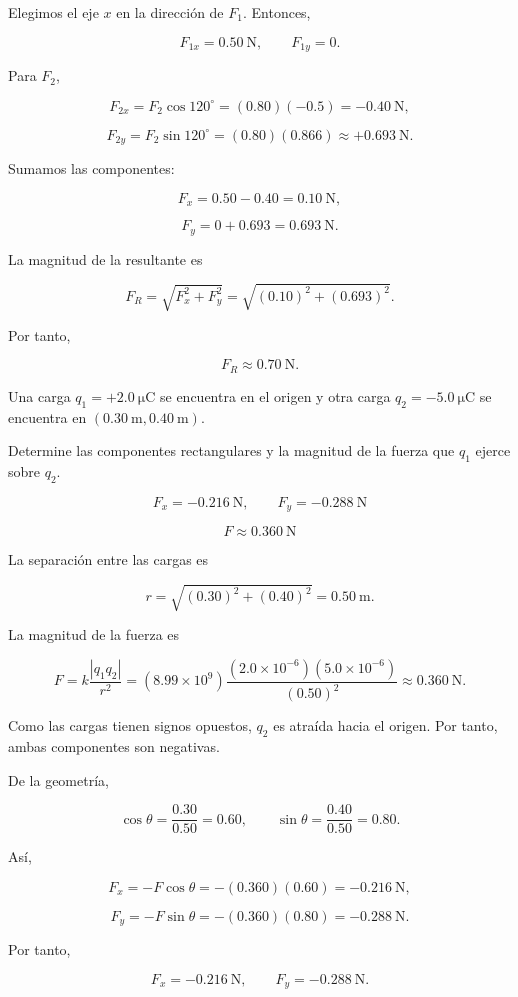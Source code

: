 \begin{explicacion}
Elegimos el eje \(x\) en la dirección de \(F_1\). Entonces,

\[
F_{1x}=\SI{0.50}{\newton}, \qquad F_{1y}=0.
\]

Para \(F_2\),

\[
F_{2x}=F_2\cos120^\circ=(0.80)(-0.5)
=-\SI{0.40}{\newton},
\]

\[
F_{2y}=F_2\sin120^\circ=(0.80)(0.866)
\approx+\SI{0.693}{\newton}.
\]

Sumamos las componentes:

\[
F_x=0.50-0.40=\SI{0.10}{\newton},
\]

\[
F_y=0+0.693=\SI{0.693}{\newton}.
\]

La magnitud de la resultante es

\[
F_R=\sqrt{F_x^2+F_y^2}
=\sqrt{(0.10)^2+(0.693)^2}.
\]

Por tanto,

\[
\boxed{F_R\approx\SI{0.70}{\newton}}.
\]
\end{explicacion}


\begin{ejercicio}
Una carga \(q_1=+\SI{2.0}{\micro\coulomb}\) se encuentra en el origen y otra
carga \(q_2=-\SI{5.0}{\micro\coulomb}\) se encuentra en
\((\SI{0.30}{\metre},\SI{0.40}{\metre})\).

Determine las componentes rectangulares y la magnitud de la fuerza que
\(q_1\) ejerce sobre \(q_2\).
\end{ejercicio}

\begin{respuesta}
\[
\boxed{F_x=-\SI{0.216}{\newton}}, \qquad
\boxed{F_y=-\SI{0.288}{\newton}}
\]

\[
\boxed{F\approx\SI{0.360}{\newton}}
\]
\end{respuesta}

\begin{explicacion}
La separación entre las cargas es

\[
r=\sqrt{(0.30)^2+(0.40)^2}=\SI{0.50}{\metre}.
\]

La magnitud de la fuerza es

\[
F=k\frac{|q_1q_2|}{r^2}
=(8.99\times10^9)
\frac{(2.0\times10^{-6})(5.0\times10^{-6})}{(0.50)^2}
\approx\SI{0.360}{\newton}.
\]

Como las cargas tienen signos opuestos, \(q_2\) es atraída hacia el origen.
Por tanto, ambas componentes son negativas.

De la geometría,

\[
\cos\theta=\frac{0.30}{0.50}=0.60, \qquad
\sin\theta=\frac{0.40}{0.50}=0.80.
\]

Así,

\[
F_x=-F\cos\theta=-(0.360)(0.60)
=-\SI{0.216}{\newton},
\]

\[
F_y=-F\sin\theta=-(0.360)(0.80)
=-\SI{0.288}{\newton}.
\]

Por tanto,

\[
\boxed{F_x=-\SI{0.216}{\newton}}, \qquad
\boxed{F_y=-\SI{0.288}{\newton}}.
\]
\end{explicacion}


